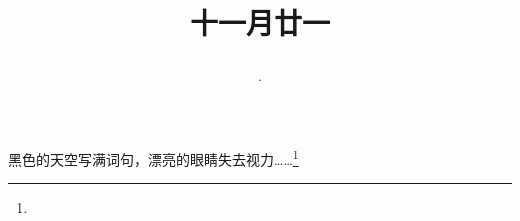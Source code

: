 \title{\date[d=2,m=1,y=2024][year:cn-y,年,month:cn,day:cn,日,·,weekday]·十一月廿一 }
黑色的天空写满词句，漂亮的眼睛失去视力……\footnote{ }

